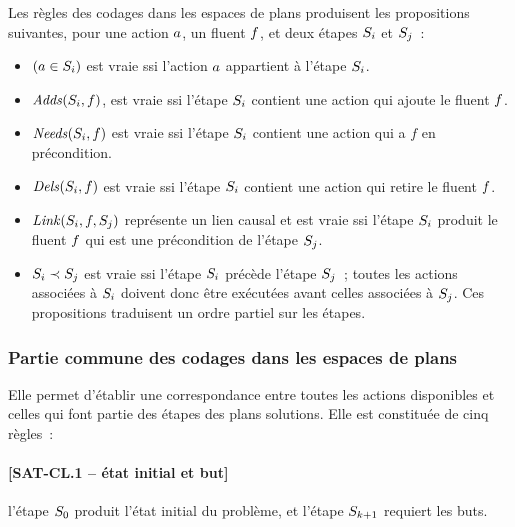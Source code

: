 {Les règles des codages dans les espaces de plans produisent les propositions suivantes, pour une action $a$, un fluent $f$, et deux étapes $S_{i}$ et $S_{j}$~:

\begin{itemize}
\item $(a \in S_{i})$ est vraie ssi l'action $a$ appartient à l'étape $S_{i}$.
\item $\mathit{Adds}(S_{i},f)$, est vraie ssi l'étape $S_{i}$ contient une action qui ajoute le
  fluent $f$.
\item $\mathit{Needs}(S_{i},f)$ est vraie ssi l'étape $S_{i}$ contient une action qui a $f$ en
  précondition.
\item $\mathit{Dels}(S_{i},f)$ est vraie ssi l'étape $S_{i}$ contient une action qui retire le
  fluent $f$.
\item $\mathit{Link}(S_{i},f,S_{j})$ représente un lien causal et est vraie ssi l'étape
  $S_{i}$ produit le fluent $f$ qui est une précondition de l'étape $S_{j}$.
\item $S_{i} \prec S_{j}$ est vraie ssi l'étape $S_{i}$ précède l'étape $S_{j}$~; toutes les actions
  associées à $S_{i}$ doivent donc être exécutées avant celles associées à $S_{j}$.
  Ces propositions traduisent un ordre partiel sur les étapes.
\end{itemize}


\subsubsection{Partie commune des codages dans les espaces de plans}

Elle permet d'établir une correspondance entre toutes les actions disponibles et
celles qui font partie des étapes des plans solutions. Elle est constituée
de cinq règles~:


\paragraph*{[SAT-CL.1 -- état initial et but]} l'étape $S_{0}$ produit l'état
  initial du problème, et l'étape $S_{k+1}$ requiert les buts.
}
